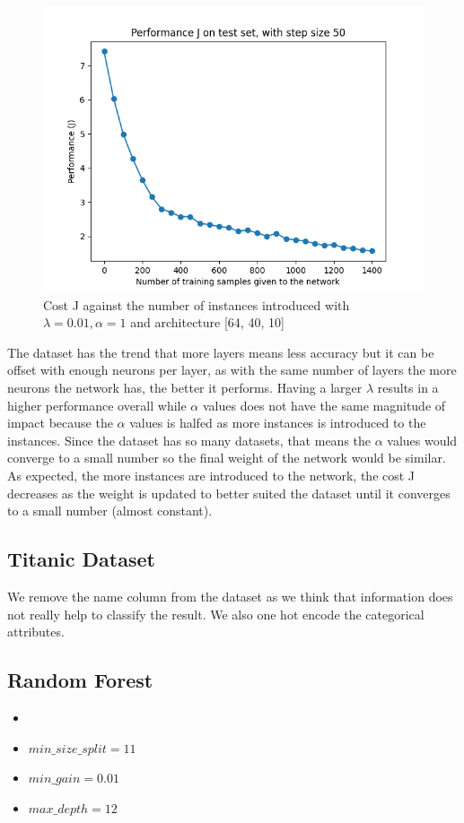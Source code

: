 \documentclass[letterpaper]{article}
\begin{document}
\begin{figure}[H]
	\includegraphics[width=\textwidth]{figures/nn_digits_cost.png}
	\caption{Cost J against the number of instances introduced with $\lambda=0.01, \alpha=1$ and architecture [64, 40, 10]}
	\label{fig:nn-digits}
\end{figure}

The dataset has the trend that more layers means less accuracy but it can be offset with enough neurons per layer, as with the same number of layers
the more neurons the network has, the better it performs. Having a larger $\lambda$ results in a higher performance overall while $\alpha$ values does
not have the same magnitude of impact because the $\alpha$ values is halfed as more instances is introduced to the instances. Since the dataset has
so many datasets, that means the $\alpha$ values would converge to a small number so the final weight of the network would be similar. As expected,
the more instances are introduced to the network, the cost J decreases as the weight is updated to better suited the dataset until it converges to a
small number (almost constant).

\subsection{Titanic Dataset}
We remove the name column from the dataset as we think that information does not really help to classify the result. We also one hot encode the categorical
attributes.

\subsection*{Random Forest}
\begin{itemize}
	\item {}
	\item $min\_size\_split = 11$
	\item $min\_gain = 0.01$
	\item $max\_depth = 12$
\end{itemize}
\end{document}
